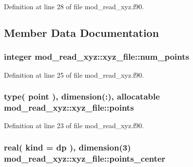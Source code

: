 Definition at line 28 of file mod\+\_\+read\+\_\+xyz.\+f90.



\subsection{Member Data Documentation}
\subsubsection[{\texorpdfstring{num\+\_\+points}{num_points}}]{\setlength{\rightskip}{0pt plus 5cm}integer mod\+\_\+read\+\_\+xyz\+::xyz\+\_\+file\+::num\+\_\+points}\hypertarget{structmod__read__xyz_1_1xyz__file_aa338247cd4ff55ae9fe9a2143fe28cdf}{}\label{structmod__read__xyz_1_1xyz__file_aa338247cd4ff55ae9fe9a2143fe28cdf}


Definition at line 25 of file mod\+\_\+read\+\_\+xyz.\+f90.

\subsubsection[{\texorpdfstring{points}{points}}]{\setlength{\rightskip}{0pt plus 5cm}type( {\bf point} ), dimension(\+:), allocatable mod\+\_\+read\+\_\+xyz\+::xyz\+\_\+file\+::points}\hypertarget{structmod__read__xyz_1_1xyz__file_a918bc6a941d85d90419f1d2c6585224e}{}\label{structmod__read__xyz_1_1xyz__file_a918bc6a941d85d90419f1d2c6585224e}


Definition at line 23 of file mod\+\_\+read\+\_\+xyz.\+f90.

\subsubsection[{\texorpdfstring{points\+\_\+center}{points_center}}]{\setlength{\rightskip}{0pt plus 5cm}real( kind = dp ), dimension(3) mod\+\_\+read\+\_\+xyz\+::xyz\+\_\+file\+::points\+\_\+center}\hypertarget{structmod__read__xyz_1_1xyz__file_a3fc6d7b23f156adb7d7ffa9aa3f3913f}{}\label{structmod__read__xyz_1_1xyz__file_a3fc6d7b23f156adb7d7ffa9aa3f3913f}


